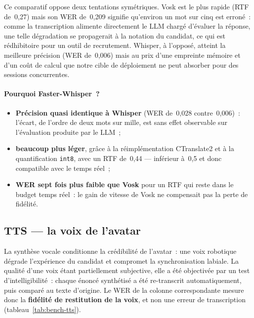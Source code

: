 Ce comparatif oppose deux tentations symétriques. Vosk est le plus rapide (RTF de~0,27) mais son
WER de~0,209 signifie qu'environ un mot sur cinq est erroné~: comme la transcription alimente
directement le LLM chargé d'évaluer la réponse, une telle dégradation se propagerait à la notation
du candidat, ce qui est rédhibitoire pour un outil de recrutement. Whisper, à l'opposé, atteint la
meilleure précision (WER de~0,006) mais au prix d'une empreinte mémoire et d'un coût de calcul que
notre cible de déploiement ne peut absorber pour des sessions concurrentes.

\paragraph{Pourquoi Faster-Whisper~?}
\begin{itemize}
  \item \textbf{Précision quasi identique à Whisper} (WER de~0,028 contre~0,006)~: l'écart, de l'ordre de deux mots sur mille, est sans effet observable sur l'évaluation produite par le LLM~;
  \item \textbf{beaucoup plus léger}, grâce à la réimplémentation CTranslate2 et à la quantification \texttt{int8}, avec un RTF de~0,44 --- inférieur à~0,5 et donc compatible avec le temps réel~;
  \item \textbf{WER sept fois plus faible que Vosk} pour un RTF qui reste dans le budget temps réel~: le gain de vitesse de Vosk ne compensait pas la perte de fidélité.
\end{itemize}

\subsection{TTS --- la voix de l'avatar}

La synthèse vocale conditionne la crédibilité de l'avatar~: une voix robotique dégrade
l'expérience du candidat et compromet la synchronisation labiale. La qualité d'une voix étant
partiellement subjective, elle a été objectivée par un test d'intelligibilité~: chaque énoncé
synthétisé a été re-transcrit automatiquement, puis comparé au texte d'origine. Le WER de la
colonne correspondante mesure donc la \textbf{fidélité de restitution de la voix}, et non une
erreur de transcription (tableau~\ref{tab:bench-tts}).

